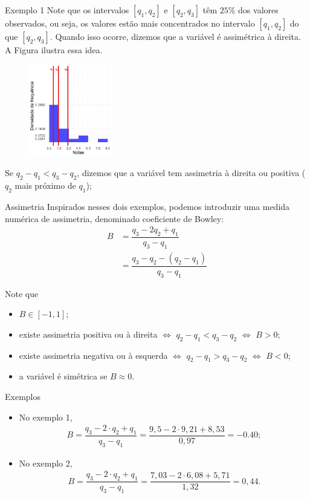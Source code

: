 \documentclass[8pt]{beamer}
\begin{document}
\begin{frame}{Exemplo 1}
Note que os intervalos $[q_1,q_2]$ e $[q_2,q_3]$  têm $25\%$ dos valores observados, ou seja, os valores estão mais concentrados no intervalo $[q_1, q_2]$ do que $[q_2, q_3]$. 
Quando isso ocorre, dizemos que a variável é assimétrica à direita. A Figura ilustra essa idea.
\begin{figure}[htbp]
\centering
\includegraphics[height=4cm]{asim_histogram_turma_2.png}
\end{figure}
Se $q_2-q_1 < q_3-q_2$, dizemos que a variável tem assimetria à direita ou positiva ($q_2$ mais próximo de $q_1$);
\end{frame}

\begin{frame}{Assimetria}
Inspirados nesses dois exemplos, podemos introduzir uma medida numérica de assimetria, denominado coeficiente de Bowley:
\begin{align*}
	B &= \dfrac{q_3 - 2q_2 +q_1}{q_3-q_1} \\
	&= \dfrac{q_3 - q_2 - (q_2 - q_1)}{q_3 - q_1}
\end{align*}

Note que 
\begin{itemize}
	\item $B \in [-1,1]$;
	\item existe assimetria positiva ou à direita $\iff$ $q_2-q_1 < q_3-q_2$ $\iff$ $B > 0$;
	\item existe assimetria negativa ou à esquerda $\iff$ $q_2-q_1 > q_3-q_2$  $\iff$ $B < 0$;
	\item a variável é simétrica se $B \approx 0$.
\end{itemize}

\begin{block}{Exemplos}
	\begin{itemize}
		\item No exemplo 1, 
		\begin{align*}
		B = \dfrac{q_3 - 2 \cdot q_2 + q_1}{q_3 - q_1} = \dfrac{9,5 - 2 \cdot 9,21 + 8,53}{0,97} = -0.40;
		\end{align*}
		\item No exemplo 2, 
		\begin{align*}
		B = \dfrac{q_3 - 2 \cdot q_2 + q_1}{q_3 - q_1} = \dfrac{7,03 - 2\cdot 6,08 + 5,71}{1,32} = 0,44.
		\end{align*}
	\end{itemize}
\end{block}
\end{frame}
	
\end{document}
